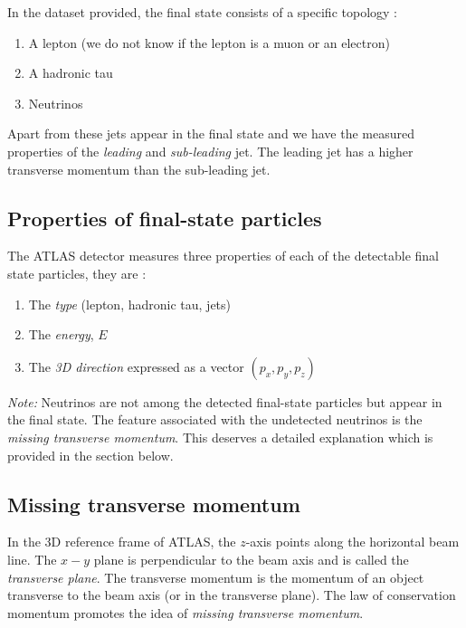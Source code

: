 \documentclass[final,3p,times,twocolumn]{elsarticle}
\begin{document}
In the dataset provided, the final state consists of a specific topology :

\begin{enumerate}[noitemsep]
\item A lepton (we do not know if the lepton is a muon or an electron)
\item A hadronic tau 
\item Neutrinos 
\end{enumerate}

Apart from these jets appear in the final state and we have the measured properties of the \textit{leading} and \textit{sub-leading} jet. The leading jet has a higher transverse momentum than the sub-leading jet. 

\subsection{Properties of final-state particles}

The ATLAS detector measures three properties of each of the detectable final state particles, they are :

\begin{enumerate}[noitemsep]
\item{The \textit{type} (lepton, hadronic tau, jets)} \item{The \textit{energy}, $E$}
\item{The \textit{3D direction} expressed as a vector $(p_{x}, p_{y}, p_{z})$}
\end{enumerate}

\textit{Note:} Neutrinos are not among the detected final-state particles but appear in the final state. The feature associated with the undetected neutrinos is the \textit{missing transverse momentum}. This deserves a detailed explanation which is provided in the section below.

\subsection{Missing transverse momentum}
\label{missing}

In the 3D reference frame of ATLAS, the $z$-axis points along the horizontal beam line. The $x-y$ plane is perpendicular to the beam axis and is called the \textit{transverse plane}. The transverse momentum is the momentum of an object transverse to the beam axis (or in the transverse plane). The law of conservation momentum promotes the idea of \textit{missing transverse momentum}.
\end{document}
